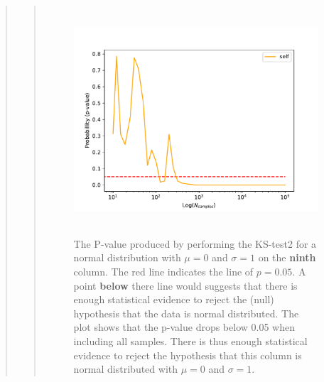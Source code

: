 \begin{quote}
\begin{quote}
\newpage

\begin{figure}[!ht]
\centering
\includegraphics[width=14cm, height=8.5cm]{./Plots/1e_plot_column_8.pdf}
\caption{The P-value produced by performing the KS-test2 for a normal distribution with $\mu = 0$ and $\sigma = 1$ on the \textbf{ninth} column.  The red line indicates the line of $ p = 0.05$. A point \textbf{below} there  line would suggests that there is enough statistical evidence to reject the (null) hypothesis that the data is normal distributed. The plot shows that the p-value drops below 0.05 when including all samples. There is thus enough statistical evidence to reject the hypothesis that this column is normal distributed with $\mu = 0$ and $\sigma = 1$.}
\end{figure}


\end{quote}
\end{quote}
